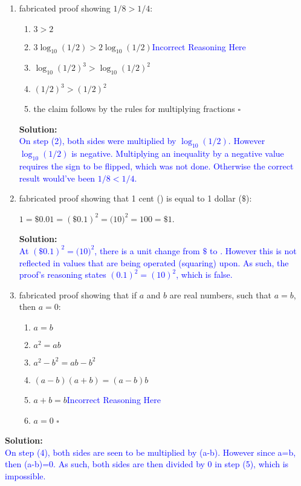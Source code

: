 \documentclass{article}
\newcommand{\sol}[1]{\textbf{Solution:\,}\textcolor{blue}{#1}}
\begin{document}
\begin{enumerate}
\begin{enumerate}
\item fabricated proof showing $1/8 > 1/4$:

\begin{center}
    \begin{minipage}{0.55\textwidth}
		\begin{enumerate}[label =(\arabic*)] 
	    \item  $3>2$ 
		\item  $3 \log_{10}(1/2) > 2 \log_{10}(1/2)$\quad\textcolor{blue}{Incorrect Reasoning Here}
		\item  $\log_{10}(1/2)^3 > \log_{10}(1/2)^2$
		\item  $(1/2)^3 > (1/2)^2$
		\item the claim follows by the rules for multiplying fractions \hfill $\square$
		\end{enumerate}
    \end{minipage}
\end{center}
\sol{
\\On step (2), both sides were multiplied by $\log_{10}(1/2)$. However $\log_{10}(1/2)$ is negative. Multiplying an inequality by a negative value requires the sign to be flipped, which was not done. Otherwise the correct result would've been $1/8 < 1/4$.
}
\item fabricated proof showing that 1 cent (\textcent) is equal to 1 dollar ($\$$):
\begin{center}
$ 1$\textcent $= \$ 0.01 = (\$ 0.1)^2  = (10$\textcent$)^2 = 100$\textcent $= \$1$.
\end{center}
\sol{
\\At $(\$ 0.1)^2  = (10$\textcent$)^2$, there is a unit change from $\$$ to \textcent. However this is not reflected in values that are being operated (squaring) upon. As such, the proof's reasoning states  $(0.1)^2 = (10)^2$, which is false.
}
\item fabricated proof showing that if $a$ and $b$ are real numbers, such that $a=b$, then $a=0$:

\begin{center}
    \begin{minipage}{0.55\textwidth}
		\begin{enumerate}[label =(\arabic*)] 
	    \item  $a=b$ 
		\item  $a^2=ab$
		\item  $a^2-b^2=ab-b^2$
		\item  $(a-b)(a+b) = (a-b)b$
		\item  $a+b = b$\quad\textcolor{blue}{Incorrect Reasoning Here}
		\item  $a = 0$ \hfill $\square$
		\end{enumerate}
    \end{minipage}
\end{center}
\end{enumerate}
\sol{
\\On step (4), both sides are seen to be multiplied by (a-b). However since a=b, then (a-b)=0. As such, both sides are then divided by 0 in step (5), which is impossible.
}

\end{enumerate}
\end{document}
